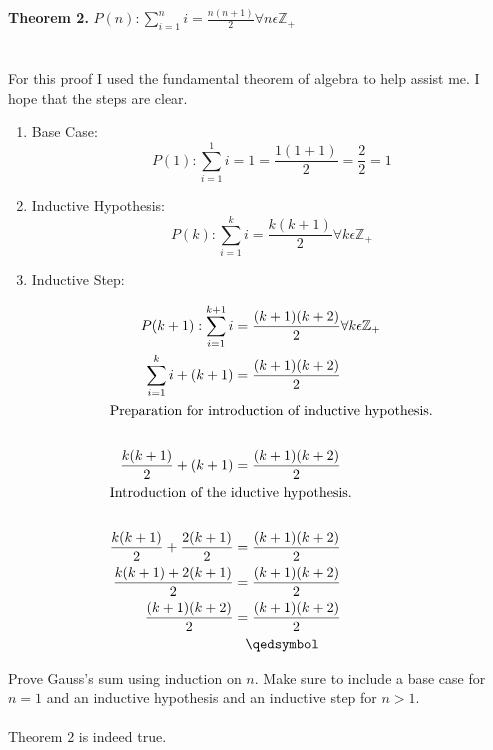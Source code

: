 \documentclass[12pt]{article}
\begin{document}
\noindent \textbf{Theorem 2.}
\begin{math}P(n):\sum\limits_{i = 1}^{n} i = \frac{n(n + 1)}{2} \forall n \epsilon \mathbb{Z}_+  \end{math}\\
\\\\For this proof I used the fundamental theorem of algebra to help assist me. I hope that the steps are clear.\\
\begin{enumerate}
\item Base Case:\\
\[P(1):\sum\limits_{i = 1}^{1} i = 1  = \frac{1(1+1)}{2} = \frac{2}{2} = 1\]
\item Inductive Hypothesis:
\[P(k):\sum\limits_{i = 1}^{k} i = \frac{k(k + 1)}{2} \forall k \epsilon \mathbb{Z}_+\]
\item Inductive Step:

\begin{align*}
P(k+1):\sum\limits_{i = 1}^{k+1} i &= \frac{(k + 1)(k+2)}{2} \forall k \epsilon \mathbb{Z}_+\\
\sum\limits_{i = 1}^{k} i + (k + 1)&= \frac{(k + 1)(k+2)}{2}\\
\intertext{Preparation for introduction of inductive hypothesis.}\\
\frac{k(k+1)}{2} + (k+1)&= \frac{(k + 1)(k+2)}{2}\\
\intertext{Introduction of the iductive hypothesis.}\\
\frac{k(k+1)}{2} + \frac{2(k+1)}{2}&= \frac{(k + 1)(k+2)}{2}\\
\frac{k(k+1)+ 2(k+1)}{2}&= \frac{(k + 1)(k+2)}{2}\\
\frac{(k + 1)(k+2)}{2}&= \frac{(k + 1)(k+2)}{2}\\
&\hspace{0.3cm}\qedsymbol
\end{align*}
\end{enumerate}
\noindent Prove Gauss’s sum using induction on \begin{math}n\end{math}. Make sure to include a base case for \begin{math} n = 1\end{math} and an inductive hypothesis and an inductive step for \begin{math}n > 1\end{math}.\\\\
\noindent Theorem 2 is indeed true.
\end{document}
